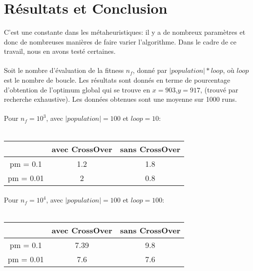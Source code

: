 \documentclass[a4paper, 11pt]{article}
\begin{document}
\section{Résultats et Conclusion}

\paragraph{}
C'est une constante dans les métaheuristiques: il y a de nombreux paramètres et donc de nombreuses manières de faire varier l'algorithme. 
Dans le cadre de ce travail, nous en avons testé certaines.

\paragraph{}
Soit le nombre d'évaluation de la fitness $n_f$, donné par $|population| * loop$, où $loop$ est le nombre de boucle.
Les résultats sont donnés en terme de pourcentage d'obtention de l'optimum global qui se trouve en
$x=903$,$y=917$, (trouvé par recherche exhaustive). Les données obtenues sont une moyenne sur 1000 runs.

\paragraph{}
Pour $n_f = 10^3$, avec $|population| = 100$ et $loop = 10$:\\
\\
\begin{tabular}{|c|c|c|}
 \hline
  & avec CrossOver & sans CrossOver\\
  \hline
  pm = 0.1 & 1.2 & 1.8\\
  \hline
  pm = 0.01 & 2 & 0.8\\
  \hline
\end{tabular}

\paragraph{}
Pour $n_f = 10^4$, avec $|population| = 100$ et $loop = 100$:\\
\\
\begin{tabular}{|c|c|c|}
 \hline
  & avec CrossOver & sans CrossOver\\
  \hline
  pm = 0.1 & 7.39 & 9.8\\
  \hline
  pm = 0.01 & 7.6 & 7.6\\
  \hline
\end{tabular}
\end{document}
